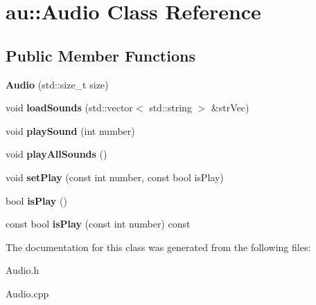 \hypertarget{classau_1_1_audio}{}\section{au\+:\+:Audio Class Reference}
\label{classau_1_1_audio}
\subsection*{Public Member Functions}
\begin{DoxyCompactItemize}
\item 
\mbox{\label{classau_1_1_audio_a1283077901a19a998fd8f8143cac2afd}} 
{\bfseries Audio} (std\+::size\+\_\+t size)
\item 
\mbox{\label{classau_1_1_audio_aefd6dff6d968ee04b969104bb44a9c58}} 
void {\bfseries load\+Sounds} (std\+::vector$<$ std\+::string $>$ \&str\+Vec)
\item 
\mbox{\label{classau_1_1_audio_a7b9a8d723671bfdfaeefc5def236d82b}} 
void {\bfseries play\+Sound} (int number)
\item 
\mbox{\label{classau_1_1_audio_a9274fa45382f546b6c2fd43df1a260c5}} 
void {\bfseries play\+All\+Sounds} ()
\item 
\mbox{\label{classau_1_1_audio_a460565f702ead9c4e35a1c0c59da9699}} 
void {\bfseries set\+Play} (const int number, const bool is\+Play)
\item 
\mbox{\label{classau_1_1_audio_a3344b317ccaa73ecd29cf8b5e2b16a46}} 
bool {\bfseries is\+Play} ()
\item 
\mbox{\label{classau_1_1_audio_abe4c6f1d59c1ad34e5cf0db7875b5cbd}} 
const bool {\bfseries is\+Play} (const int number) const
\end{DoxyCompactItemize}


The documentation for this class was generated from the following files\+:\begin{DoxyCompactItemize}
\item 
Audio.\+h\item 
Audio.\+cpp\end{DoxyCompactItemize}
